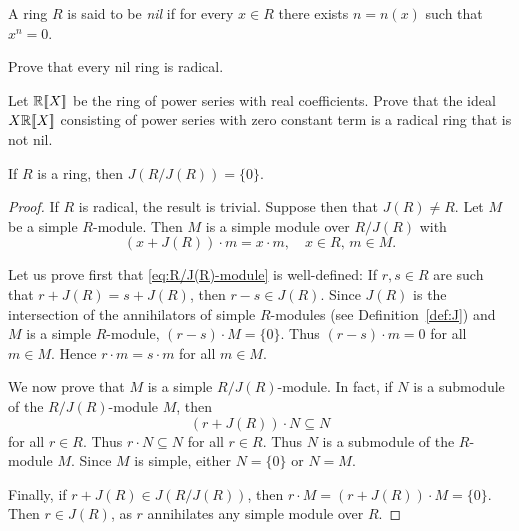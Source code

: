 
\begin{definition}
A ring $R$ is said to be \emph{nil} if for every $x\in R$ there
exists $n=n(x)$ such that $x^n=0$. 
\end{definition}

\begin{exercise}
    Prove that every nil ring is radical.
\end{exercise}

\begin{exercise}
    Let $\mathbb{R}[\![X]\!]$ be the ring of power series with real coefficients. Prove that the ideal 
    $X\mathbb{R}[\![X]\!]$ consisting of power series with zero constant term is a radical ring
    that is not nil. 
\end{exercise}

\begin{theorem}
	\label{thm:J(R/J)=0}
	If $R$ is a ring, then $J(R/J(R))=\{0\}$.
\end{theorem}

\begin{proof}
	If $R$ is radical, the result is trivial. Suppose then that 
	$J(R)\ne R$. Let $M$ be a simple $R$-module. Then $M$ is 
	a simple module over $R/J(R)$ with 
	\begin{equation}
	    \label{eq:R/J(R)-module}
     	(x+J(R))\cdot m=x\cdot m,\quad
		x\in R,\,m\in M.
	\end{equation}
 
    Let us prove first that \eqref{eq:R/J(R)-module} is well-defined: If $r,s\in R$ are such that $r+J(R)=s+J(R)$, then 
    $r-s\in J(R)$. Since $J(R)$ is the intersection
    of the annihilators of simple $R$-modules (see Definition~\ref{def:J}) and $M$ is a simple $R$-module, 
    $(r-s)\cdot M=\{0\}$. Thus $(r-s)\cdot m=0$ for all $m\in M$. Hence $r\cdot m=s\cdot m$ for all $m\in M$. 

    We now prove that $M$ is a simple $R/J(R)$-module. In fact, 
    if $N$ is a submodule of the $R/J(R)$-module $M$, then 
    \[
    (r+J(R))\cdot N\subseteq N
    \]
    for all $r\in R$. Thus $r\cdot N\subseteq N$ for all $r\in R$. Thus $N$ is a submodule of the $R$-module $M$. Since $M$ is simple, either $N=\{0\}$ or $N=M$. 

    Finally, if $r+J(R)\in J(R/J(R))$, then  $r\cdot M=(r+J(R))\cdot M=\{0\}$. Then $r\in J(R)$, as 
	$r$ annihilates any simple module over $R$.
\end{proof}

